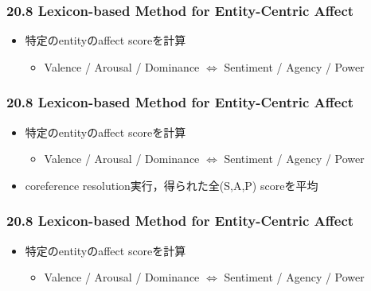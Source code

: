 
\begin{frame}
    \frametitle{20.8 Lexicon-based Method for Entity-Centric Affect}
    \begin{itemize}
        \item 特定のentityのaffect scoreを計算 
        \begin{itemize}
            \item Valence / Arousal / Dominance $\Leftrightarrow$ Sentiment / Agency / Power
        \end{itemize}
    \end{itemize}
\end{frame}


\begin{frame}
    \frametitle{20.8 Lexicon-based Method for Entity-Centric Affect}
    \begin{itemize}
        \item 特定のentityのaffect scoreを計算 
        \begin{itemize}
            \item Valence / Arousal / Dominance $\Leftrightarrow$ Sentiment / Agency / Power
        \end{itemize}
    \end{itemize}
    \begin{itemize}
        \small
        \item coreference resolution実行，得られた全(S,A,P) scoreを平均
    \end{itemize}
\end{frame}


\begin{frame}
    \frametitle{20.8 Lexicon-based Method for Entity-Centric Affect}
    \begin{itemize}
        \item 特定のentityのaffect scoreを計算 
        \begin{itemize}
            \item Valence / Arousal / Dominance $\Leftrightarrow$ Sentiment / Agency / Power
        \end{itemize}
    \end{itemize}
\end{frame}


